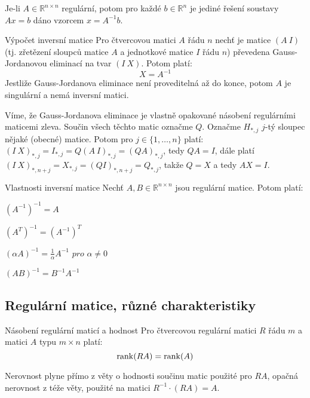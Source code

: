 \begin{veta}
Je-li $A \in \mathbb{R}^{n \times n}$ regulární, potom pro každé $b \in \mathbb{R}^n$ je jediné řešení soustavy $Ax=b$ dáno vzorcem $x = A^{-1}b$.
\end{veta}

\begin{vetaN}{Výpočet inversní matice}
Pro čtvercovou matici $A$ řádu $n$ nechť je matice $(A\ I)$ (tj. zřetězení sloupců matice $A$ a jednotkové matice $I$ řádu $n$) převedena  Gauss-Jordanovou eliminací na tvar $(I\ X)$. Potom platí: 
$$X=A^{-1}$$ 
Jestliže Gauss-Jordanova eliminace není proveditelná až do konce, potom $A$ je singulární a nemá inversní matici.

\medskip
\begin{dukaz}
Víme, že Gauss-Jordanova eliminace je vlastně opakované násobení regulárními maticemi zleva. Součin všech těchto matic označme $Q$. Označme $H_{*,j}$ $j$-tý sloupec nějaké (obecné) matice. Potom pro $j\in\{1,\dots,n\}$ platí: $(I\ X)_{*,j}=I_{*,j}=Q(A\ I)_{*,j}=(QA)_{*,j}$, tedy $QA=I$, dále platí $(I\ X)_{*,n+j}=X_{*,j}=(QI)_{*,n+j}=Q_{*,j}$, takže $Q=X$ a tedy $AX=I$.
\end{dukaz}
\end{vetaN}

\begin{vetaN}{Vlastnosti inversní matice}
Nechť $A,B \in \mathbb{R}^{n \times n}$ jsou regulární matice. Potom platí:
\begin{penumerate}
	\item $(A^{-1})^{-1} = A$
	\item $(A^{T})^{-1} = (A^{-1})^{T}$
	\item $(\alpha A)^{-1} = \frac{1}{\alpha} A^{-1} \textit{ pro }\alpha \neq 0$
	\item $(AB)^{-1} = B^{-1} A^{-1}$
\end{penumerate}
\end{vetaN}


\subsection{Regulární matice, různé charakteristiky}

\begin{vetaN}{Násobení regulární maticí a hodnost}
Pro čtvercovou regulární matici $R$ řádu $m$ a matici $A$ typu $m\times n$ platí:
$$\mathrm{rank}(RA)=\mathrm{rank}(A)$$

\medskip
\begin{dukaz}
Nerovnost \uv{$\leq$} plyne přímo z věty o hodnosti součinu matic použité pro $RA$, opačná nerovnost z téže věty, použité na matici $R^{-1}\cdot(RA)=A$.
\end{dukaz}
\end{vetaN}

